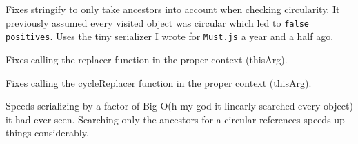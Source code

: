 
\begin{DoxyItemize}
\item Fixes stringify to only take ancestors into account when checking circularity. It previously assumed every visited object was circular which led to \href{https://github.com/isaacs/json-stringify-safe/issues/9}{\tt false positives}. Uses the tiny serializer I wrote for \href{https://github.com/moll/js-must}{\tt Must.\+js} a year and a half ago.
\item Fixes calling the {\ttfamily replacer} function in the proper context ({\ttfamily this\+Arg}).
\item Fixes calling the {\ttfamily cycle\+Replacer} function in the proper context ({\ttfamily this\+Arg}).
\item Speeds serializing by a factor of Big-\/\+O(h-\/my-\/god-\/it-\/linearly-\/searched-\/every-\/object) it had ever seen. Searching only the ancestors for a circular references speeds up things considerably. 
\end{DoxyItemize}